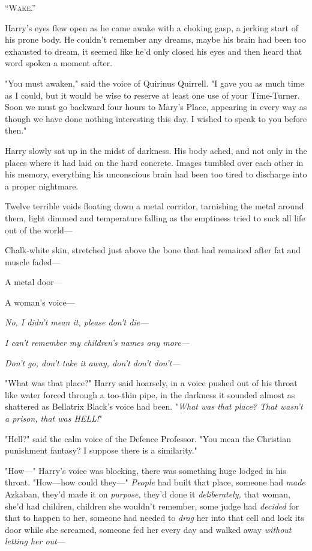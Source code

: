 
\lettrine{“W}{ake}.”

\quad\quad\quad
Harry's eyes flew open as he came awake with a choking gasp, a jerking start of
his prone body. He couldn't remember any dreams, maybe his brain had been too
exhausted to dream, it seemed like he'd only closed his eyes and then heard
that word spoken a moment after.

"You must awaken," said the voice of Quirinus Quirrell. "I gave you as much
time as I could, but it would be wise to reserve at least one use of your
Time-Turner. Soon we must go backward four hours to Mary's Place, appearing in
every way as though we have done nothing interesting this day. I wished to
speak to you before then."

Harry slowly sat up in the midst of darkness. His body ached, and not only in
the places where it had laid on the hard concrete. Images tumbled over each
other in his memory, everything his unconscious brain had been too tired to
discharge into a proper nightmare.

Twelve terrible voids floating down a metal corridor, tarnishing the metal
around them, light dimmed and temperature falling as the emptiness tried to
suck all life out of the world—

Chalk-white skin, stretched just above the bone that had remained after fat and
muscle faded—

A metal door—

A woman's voice—

\emph{No, I didn't mean it, please don't die—}

\emph{I can't remember my children's names any more—}

\emph{Don't go, don't take it away, don't don't don't—}

"What was that place?" Harry said hoarsely, in a voice pushed out of his throat
like water forced through a too-thin pipe, in the darkness it sounded almost as
shattered as Bellatrix Black's voice had been. "\emph{What was that place? That
wasn't a prison, that was HELL!}"

"Hell?" said the calm voice of the Defence Professor. "You mean the Christian
punishment fantasy? I suppose there is a similarity."

"How—" Harry's voice was blocking, there was something huge lodged in his
throat. "How—how could they—" \emph{People} had built that place, someone
had \emph{made} Azkaban, they'd made it on \emph{purpose,} they'd done it
\emph{deliberately,} that woman, she'd had children, children she wouldn't
remember, some judge had \emph{decided} for that to happen to her, someone had
needed to \emph{drag} her into that cell and lock its door while she screamed,
someone fed her every day and walked away \emph{without letting her out}—

